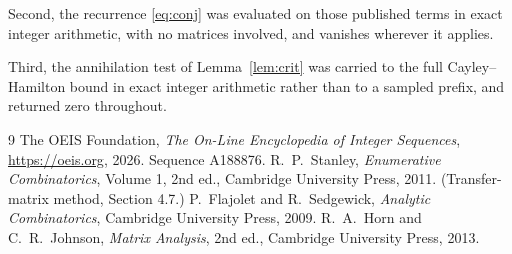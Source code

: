 \documentclass[11pt,a4paper]{article}
\theoremstyle{plain}
\theoremstyle{definition}
\begin{document}
Second, the recurrence \eqref{eq:conj} was evaluated on those published terms in exact
integer arithmetic, with no matrices involved, and vanishes wherever it applies.

Third, the annihilation test of Lemma~\ref{lem:crit} was carried to the full
Cayley--Hamilton bound in exact integer arithmetic rather than to a sampled prefix, and
returned zero throughout.

\begin{thebibliography}{9}
 The OEIS Foundation, \emph{The On-Line Encyclopedia of Integer
Sequences}, \url{https://oeis.org}, 2026. Sequence A188876.
 R.~P.~Stanley, \emph{Enumerative Combinatorics}, Volume 1, 2nd ed.,
Cambridge University Press, 2011. (Transfer-matrix method, Section 4.7.)
 P.~Flajolet and R.~Sedgewick, \emph{Analytic Combinatorics}, Cambridge
University Press, 2009.
 R.~A.~Horn and C.~R.~Johnson, \emph{Matrix Analysis}, 2nd ed., Cambridge
University Press, 2013.
\end{thebibliography}
\end{document}
